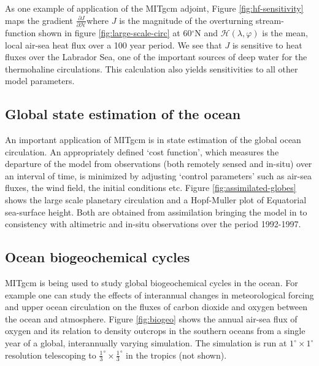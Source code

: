 As one example of application of the MITgcm adjoint, Figure \ref{fig:hf-sensitivity}
maps the gradient $\frac{\partial J}{\partial \mathcal{H}}$where $J$ is the magnitude
of the overturning stream-function shown in figure \ref{fig:large-scale-circ}
at 60$^{\circ }$N and $
\mathcal{H}(\lambda,\varphi)$ is the mean, local air-sea heat flux over
a 100 year period. We see that $J$ is
sensitive to heat fluxes over the Labrador Sea, one of the important sources
of deep water for the thermohaline circulations. This calculation also
yields sensitivities to all other model parameters.



\subsection{Global state estimation of the ocean}

An important application of MITgcm is in state estimation of the global
ocean circulation. An appropriately defined `cost function', which measures
the departure of the model from observations (both remotely sensed and
in-situ) over an interval of time, is minimized by adjusting `control
parameters' such as air-sea fluxes, the wind field, the initial conditions
etc. Figure \ref{fig:assimilated-globes} shows the large scale planetary
circulation and a Hopf-Muller plot of Equatorial sea-surface height.
Both are obtained from assimilation bringing the model in to
consistency with altimetric and in-situ observations over the period
1992-1997.



\subsection{Ocean biogeochemical cycles}

MITgcm is being used to study global biogeochemical cycles in the ocean. For
example one can study the effects of interannual changes in meteorological
forcing and upper ocean circulation on the fluxes of carbon dioxide and
oxygen between the ocean and atmosphere. Figure \ref{fig:biogeo} shows 
the annual air-sea flux of oxygen and its relation to density outcrops in 
the southern oceans from a single year of a global, interannually varying 
simulation. The simulation is run at $1^{\circ}\times1^{\circ}$ resolution
telescoping to $\frac{1}{3}^{\circ}\times\frac{1}{3}^{\circ}$ in the tropics (not shown).

